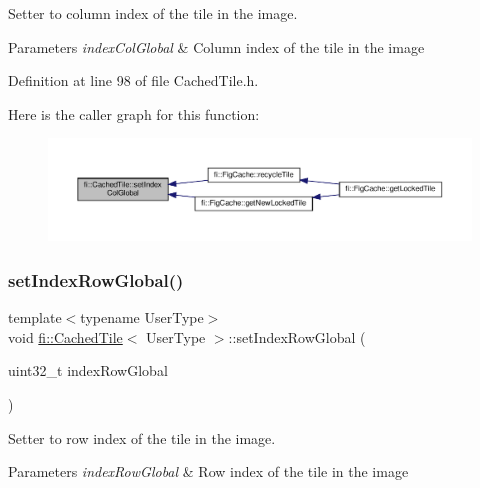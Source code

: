 Setter to column index of the tile in the image. 


\begin{DoxyParams}{Parameters}
{\em index\+Col\+Global} & Column index of the tile in the image \\
\hline
\end{DoxyParams}


Definition at line 98 of file Cached\+Tile.\+h.

Here is the caller graph for this function\+:
\nopagebreak
\begin{figure}[H]
\begin{center}
\leavevmode
\includegraphics[width=350pt]{d0/dbc/classfi_1_1CachedTile_ad95876a2ad4b7bd2199c9645047d8e4c_icgraph}
\end{center}
\end{figure}
\mbox{\label{classfi_1_1CachedTile_a18d2ea689e777d9d341fa09564edc752}} 
\subsubsection{\texorpdfstring{set\+Index\+Row\+Global()}{setIndexRowGlobal()}}
{\footnotesize\ttfamily template$<$typename User\+Type$>$ \\
void \hyperlink{classfi_1_1CachedTile}{fi\+::\+Cached\+Tile}$<$ User\+Type $>$\+::set\+Index\+Row\+Global (\begin{DoxyParamCaption}\item[{uint32\+\_\+t}]{index\+Row\+Global }\end{DoxyParamCaption})\hspace{0.3cm}{\ttfamily [inline]}}



Setter to row index of the tile in the image. 


\begin{DoxyParams}{Parameters}
{\em index\+Row\+Global} & Row index of the tile in the image \\
\hline
\end{DoxyParams}


